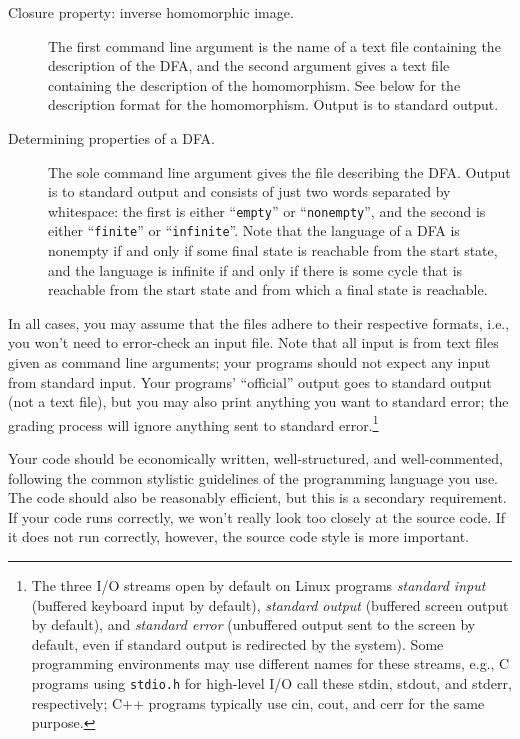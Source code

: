 \begin{description}
\item[Closure property: inverse homomorphic image.]
The first command line argument is the name of a text file containing
the description of the DFA, and the second argument gives a text file
containing the description of the homomorphism.
See below for the description format for the homomorphism.
Output is to standard output.

\item[Determining properties of a DFA\@.]
The sole command line argument gives the file describing the DFA\@.
Output is to standard output and consists of just two words separated
by whitespace: the first is either ``\texttt{empty}'' or
``\texttt{nonempty}'', and the second is either ``\texttt{finite}''
or ``\texttt{infinite}''.
Note that the language of a DFA is nonempty if and only if some final state
is reachable from the start state, and the language is infinite
if and only if there is some cycle that is reachable from the start state and
from which a final state is reachable.
\end{description}

In all cases, you may assume that the files adhere to their respective
formats, i.e., you won't need to error-check an input file.
Note that all input is from text files given as command line arguments;
your programs should not expect any input from standard input.
Your programs' ``official'' output goes to standard output (not a
text file), but you may also print anything you want to standard error;
the grading process will ignore anything sent to standard
error.\footnote{The three I/O streams open by default on Linux programs
\emph{standard input} (buffered keyboard input by default),
\emph{standard output} (buffered screen output by default),
and \emph{standard error} (unbuffered output sent to the screen by default,
even if standard output is redirected by the system).
Some programming environments may use different names for these streams,
e.g., C programs using
\texttt{stdio.h} for high-level I/O call these stdin, stdout, and stderr,
respectively; C++ programs typically use cin, cout, and cerr for the
same purpose.}

Your code should be economically written, well-structured, and
well-commented, following the common stylistic guidelines of the
programming language you use.
The code should also be reasonably efficient, but this is a secondary
requirement.
If your code runs correctly, we won't really look too closely at the
source code.
If it does not run correctly, however, the source code style is more important.

